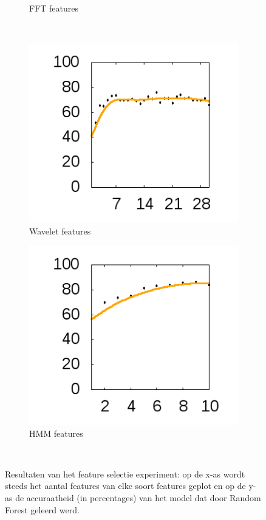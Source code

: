 \documentclass{article}
\begin{document}
\begin{figure}[htb]
\begin{subfigure}[b]{.49\linewidth}
    \caption{FFT features}\label{fig:1b}
  \end{subfigure} \\
  \begin{subfigure}[b]{.49\linewidth}
    \centering
    \includegraphics[width=.99\textwidth]{figures/DWTFeatures}
    \caption{Wavelet features}\label{fig:1c}
  \end{subfigure}
  \begin{subfigure}[b]{.49\linewidth}
    \centering
    \includegraphics[width=.99\textwidth]{figures/HMMFeatures}
    \caption{HMM features}\label{fig:1e}
  \end{subfigure} \\
  

  \caption{Resultaten van het feature selectie experiment: op de x-as wordt steeds het aantal features van elke soort features geplot en op de y-as de accuraatheid (in percentages) van het model dat door Random Forest geleerd werd.}\label{fig:1}
\end{figure}
\end{document}
